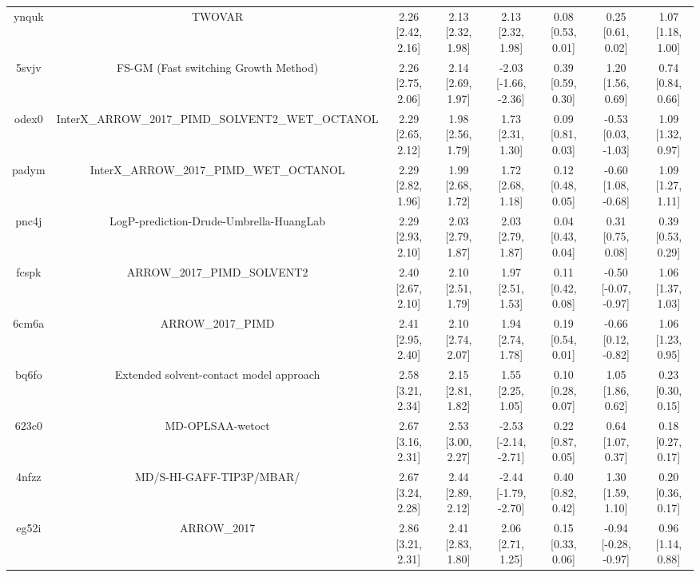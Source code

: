 \documentclass{article}
\begin{document}
\begin{center}
\begin{longtable}{|cccccccc|}
 ynquk &                                             TWOVAR &  2.26 [2.42, 2.16] &  2.13 [2.32, 1.98] &     2.13 [2.32, 1.98] &  0.08 [0.53, 0.01] &     0.25 [0.61, 0.02] &     1.07 [1.18, 1.00] \\
 5svjv &               FS-GM (Fast switching Growth Method) &  2.26 [2.75, 2.06] &  2.14 [2.69, 1.97] &  -2.03 [-1.66, -2.36] &  0.39 [0.59, 0.30] &     1.20 [1.56, 0.69] &     0.74 [0.84, 0.66] \\
 odex0 &  InterX\_ARROW\_2017\_PIMD\_SOLVENT2\_WET\_OCTANOL &  2.29 [2.65, 2.12] &  1.98 [2.56, 1.79] &     1.73 [2.31, 1.30] &  0.09 [0.81, 0.03] &   -0.53 [0.03, -1.03] &     1.09 [1.32, 0.97] \\
 padym &            InterX\_ARROW\_2017\_PIMD\_WET\_OCTANOL &  2.29 [2.82, 1.96] &  1.99 [2.68, 1.72] &     1.72 [2.68, 1.18] &  0.12 [0.48, 0.05] &   -0.60 [1.08, -0.68] &     1.09 [1.27, 1.11] \\
 pnc4j &            LogP-prediction-Drude-Umbrella-HuangLab &  2.29 [2.93, 2.10] &  2.03 [2.79, 1.87] &     2.03 [2.79, 1.87] &  0.04 [0.43, 0.04] &     0.31 [0.75, 0.08] &     0.39 [0.53, 0.29] \\
 fcspk &                        ARROW\_2017\_PIMD\_SOLVENT2 &  2.40 [2.67, 2.10] &  2.10 [2.51, 1.79] &     1.97 [2.51, 1.53] &  0.11 [0.42, 0.08] &  -0.50 [-0.07, -0.97] &     1.06 [1.37, 1.03] \\
 6cm6a &                                  ARROW\_2017\_PIMD &  2.41 [2.95, 2.40] &  2.10 [2.74, 2.07] &     1.94 [2.74, 1.78] &  0.19 [0.54, 0.01] &   -0.66 [0.12, -0.82] &     1.06 [1.23, 0.95] \\
 bq6fo &            Extended solvent-contact model approach &  2.58 [3.21, 2.34] &  2.15 [2.81, 1.82] &     1.55 [2.25, 1.05] &  0.10 [0.28, 0.07] &     1.05 [1.86, 0.62] &     0.23 [0.30, 0.15] \\
 623c0 &                                   MD-OPLSAA-wetoct &  2.67 [3.16, 2.31] &  2.53 [3.00, 2.27] &  -2.53 [-2.14, -2.71] &  0.22 [0.87, 0.05] &     0.64 [1.07, 0.37] &     0.18 [0.27, 0.17] \\
 4nfzz &                           MD/S-HI-GAFF-TIP3P/MBAR/ &  2.67 [3.24, 2.28] &  2.44 [2.89, 2.12] &  -2.44 [-1.79, -2.70] &  0.40 [0.82, 0.42] &     1.30 [1.59, 1.10] &     0.20 [0.36, 0.17] \\
 eg52i &                                        ARROW\_2017 &  2.86 [3.21, 2.31] &  2.41 [2.83, 1.80] &     2.06 [2.71, 1.25] &  0.15 [0.33, 0.06] &  -0.94 [-0.28, -0.97] &     0.96 [1.14, 0.88] \\

\end{longtable}
\end{center}
\end{document}
